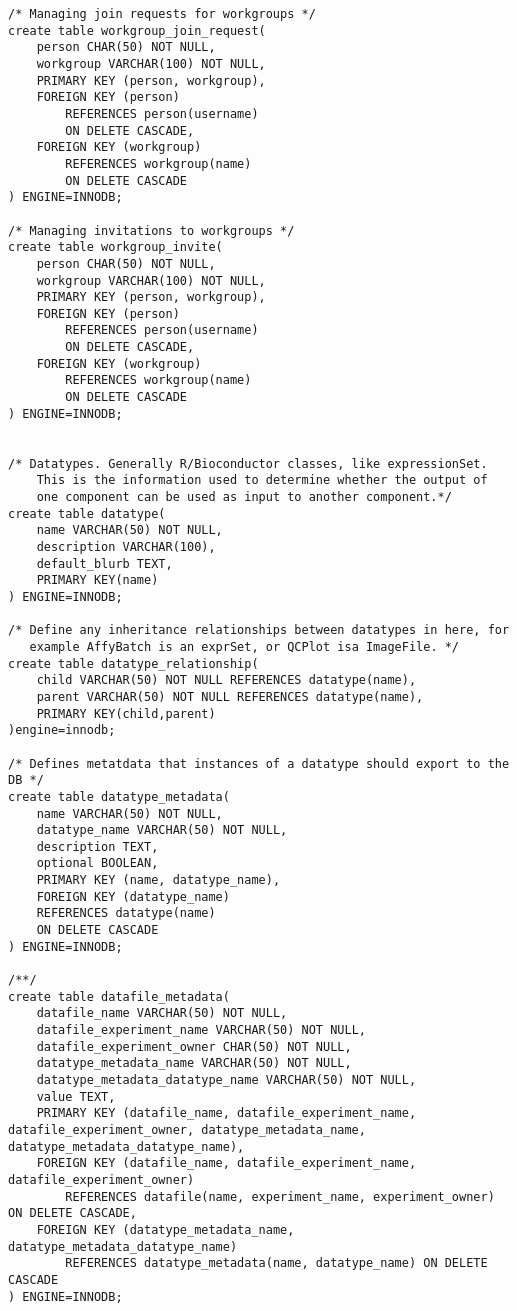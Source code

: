 \begin{tiny}
\begin{verbatim}
/* Managing join requests for workgroups */
create table workgroup_join_request(
	person CHAR(50) NOT NULL,
	workgroup VARCHAR(100) NOT NULL,
	PRIMARY KEY (person, workgroup),
	FOREIGN KEY (person) 
		REFERENCES person(username) 
		ON DELETE CASCADE,
	FOREIGN KEY (workgroup) 
		REFERENCES workgroup(name) 
		ON DELETE CASCADE
) ENGINE=INNODB;
	
/* Managing invitations to workgroups */
create table workgroup_invite(
	person CHAR(50) NOT NULL,
	workgroup VARCHAR(100) NOT NULL,
	PRIMARY KEY (person, workgroup),
	FOREIGN KEY (person) 
		REFERENCES person(username) 
		ON DELETE CASCADE,
	FOREIGN KEY (workgroup) 
		REFERENCES workgroup(name) 
		ON DELETE CASCADE
) ENGINE=INNODB;


/* Datatypes. Generally R/Bioconductor classes, like expressionSet. 
	This is the information used to determine whether the output of 
	one component can be used as input to another component.*/
create table datatype(
	name VARCHAR(50) NOT NULL,
	description VARCHAR(100),
	default_blurb TEXT,
	PRIMARY KEY(name)
) ENGINE=INNODB;

/* Define any inheritance relationships between datatypes in here, for
   example AffyBatch is an exprSet, or QCPlot isa ImageFile. */	
create table datatype_relationship(
	child VARCHAR(50) NOT NULL REFERENCES datatype(name),
	parent VARCHAR(50) NOT NULL REFERENCES datatype(name),
	PRIMARY KEY(child,parent)
)engine=innodb;

/* Defines metatdata that instances of a datatype should export to the DB */
create table datatype_metadata(
	name VARCHAR(50) NOT NULL,
	datatype_name VARCHAR(50) NOT NULL,
	description TEXT,
	optional BOOLEAN,
	PRIMARY KEY (name, datatype_name),
	FOREIGN KEY (datatype_name) 
	REFERENCES datatype(name) 
	ON DELETE CASCADE
) ENGINE=INNODB;

/**/
create table datafile_metadata(
	datafile_name VARCHAR(50) NOT NULL,
	datafile_experiment_name VARCHAR(50) NOT NULL,
	datafile_experiment_owner CHAR(50) NOT NULL,
	datatype_metadata_name VARCHAR(50) NOT NULL,
	datatype_metadata_datatype_name VARCHAR(50) NOT NULL,
	value TEXT,
	PRIMARY KEY (datafile_name, datafile_experiment_name, datafile_experiment_owner, datatype_metadata_name, datatype_metadata_datatype_name),
	FOREIGN KEY (datafile_name, datafile_experiment_name, datafile_experiment_owner) 
		REFERENCES datafile(name, experiment_name, experiment_owner) ON DELETE CASCADE,
	FOREIGN KEY (datatype_metadata_name, datatype_metadata_datatype_name) 
		REFERENCES datatype_metadata(name, datatype_name) ON DELETE CASCADE
) ENGINE=INNODB;



\end{verbatim}
\end{tiny}
